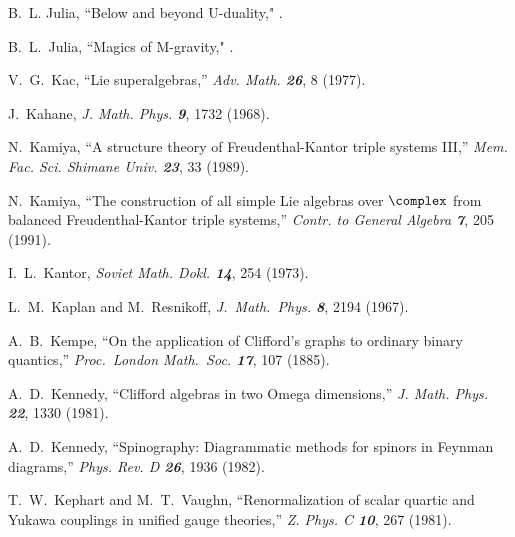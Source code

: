  B.~L. Julia,
    ``Below and beyond U-duality,"
.

 B.~L.~Julia,
    ``Magics of M-gravity,"
.



V.~G.~Kac,
``Lie superalgebras,''
{\em Adv.  Math.    \bf 26}, 8 (1977).

 J.~Kahane,
{\em J. Math. Phys.   \bf 9}, 1732 (1968).

 N.~Kamiya,
``A structure theory of Freudenthal-Kantor triple systems III,''
{\em Mem. Fac. Sci. Shimane Univ. \bf 23}, 33 (1989).   %

 N.~Kamiya,
``The construction of all simple Lie algebras
over $\complex$ from balanced Freudenthal-Kantor triple systems,''
{\em Contr. to General Algebra \bf 7}, 205 (1991).      %

 I.~L.~Kantor,
{\em Soviet Math. Dokl.  \bf 14}, 254 (1973).

L.~M.~Kaplan and M.~Resnikoff,
{\em J.~Math.~Phys.  \bf 8}, 2194 (1967).

 A.~B.~Kempe,
``On the application of Clifford's graphs to ordinary
  binary quantics,''
{\em Proc.~London Math.~Soc. \bf 17}, 107 (1885). %

A.~D.~Kennedy,
``Clifford algebras in two Omega dimensions,''
{\em J.  Math.  Phys.    \bf 22}, 1330 (1981).

A.~D.~Kennedy,
``Spinography: Diagrammatic methods for spinors in Feynman diagrams,''
{\em Phys.  Rev.  D \bf 26}, 1936 (1982).

%
T.~W.~Kephart and M.~T.~Vaughn,
``Renormalization of scalar quartic and Yukawa couplings
in unified gauge theories,''
{\em Z.  Phys. C   \bf 10}, 267 (1981).


